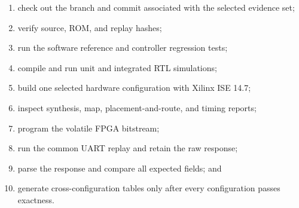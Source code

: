 \begin{enumerate}
  \item check out the branch and commit associated with the selected evidence set;
  \item verify source, ROM, and replay hashes;
  \item run the software reference and controller regression tests;
  \item compile and run unit and integrated RTL simulations;
  \item build one selected hardware configuration with Xilinx ISE 14.7;
  \item inspect synthesis, map, placement-and-route, and timing reports;
  \item program the volatile FPGA bitstream;
  \item run the common UART replay and retain the raw response;
  \item parse the response and compare all expected fields; and
  \item generate cross-configuration tables only after every configuration passes
  exactness.
\end{enumerate}
